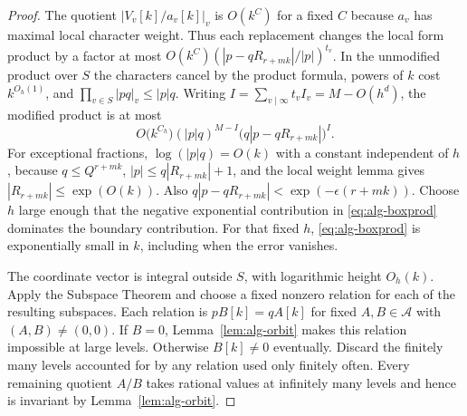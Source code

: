 \documentclass[11pt,a4paper,reqno]{amsart}
\theoremstyle{definition}
\theoremstyle{remark}
\numberwithin{equation}{section}
\begin{document}
\begin{proof}
The quotient \(|V_v[k]/a_v[k]|_v\) is \(O(k^C)\) for a fixed \(C\)
because \(a_v\) has maximal local character weight. Thus each
replacement changes the local form product by a factor at most
\(O(k^C)(|p-qR_{r+mk}|/|p|)^{t_v}\).
In the unmodified product over \(S\) the characters cancel by
the product formula, powers of \(k\) cost \(k^{O_h(1)}\), and
\(\prod_{v\in S}|pq|_v\le |p|q\).
Writing \(I=\sum_{v\mid\infty}t_v I_v=M-O(h^d)\), the modified
product is at most
\begin{equation}\label{eq:alg-boxprod}
 O\bigl(k^{C_h}\bigr)(|p|q)^{M-I}
       \bigl(q|p-qR_{r+mk}|\bigr)^I.
\end{equation}
For exceptional fractions, \(\log(|p|q)=O(k)\) with a constant
independent of \(h\), because \(q\le Q^{r+mk}\),
\(|p|\le q|R_{r+mk}|+1\), and the local weight lemma gives
\(|R_{r+mk}|\le\exp(O(k))\). Also
\(q|p-qR_{r+mk}|<\exp(-\epsilon(r+mk))\). Choose \(h\) large
enough that the negative exponential contribution in
\eqref{eq:alg-boxprod} dominates the boundary contribution.
For that fixed \(h\), \eqref{eq:alg-boxprod} is exponentially
small in \(k\), including when the error vanishes.

The coordinate vector is integral outside \(S\), with logarithmic
height \(O_h(k)\). Apply the Subspace Theorem and choose a fixed
nonzero relation for each of the resulting subspaces. Each relation
is \(pB[k]=qA[k]\) for fixed \(A,B\in\mathcal A\) with
\((A,B)\ne(0,0)\). If \(B=0\), Lemma~\ref{lem:alg-orbit} makes
this relation impossible at large levels. Otherwise \(B[k]\ne0\)
eventually. Discard the finitely many levels accounted for by any
relation used only finitely often. Every remaining quotient \(A/B\)
takes rational values at infinitely many levels and hence is
invariant by Lemma~\ref{lem:alg-orbit}.
\end{proof}
\end{document}
